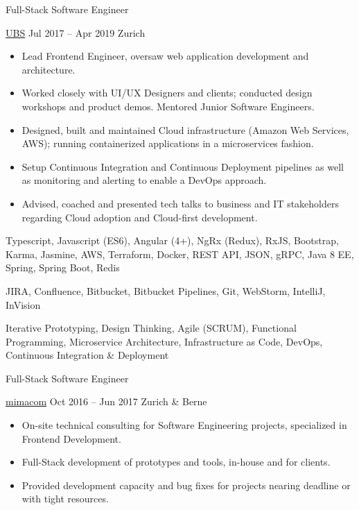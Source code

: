 \documentclass[11pt, a4paper, ragged2e, withhyper]{altacv}
\renewcommand{\cvevent}[4]{%
  {\Large\color{emphasis}#1\par}
  \medskip\normalsize
  \ifstrequal{#2}{}{}{
  	{#2}}
  \ifstrequal{#3}{}{}{{
  	\hspace{0.5em}
  	{#3}}}
  \ifstrequal{#4}{}{}{{
  	\hspace{0.5em}
  	{#4}}}\par
  \medskip\normalsize
}
\begin{document}
\begin{paracol}{2}
	\bigskip\bigskip

	\cvevent{Full-Stack Software Engineer}{\href{https://www.ubs.com/ch/en.html}{UBS}}{Jul 2017 -- Apr 2019}{Zurich}

	\bigskip
	\begin{itemize}[label=\color{bullet}\textbullet]
		\item Lead Frontend Engineer, oversaw web application development and architecture.
		\item Worked closely with UI/UX Designers and clients; conducted design workshops and product demos. Mentored Junior Software Engineers.
		\item Designed, built and maintained Cloud infrastructure (Amazon Web Services, AWS); running containerized applications in a microservices fashion.
		\item Setup Continuous Integration and Continuous Deployment pipelines as well as monitoring and alerting to enable a DevOps approach.
		\item Advised, coached and presented tech talks to business and IT stakeholders regarding Cloud adoption and Cloud-first development.
	\end{itemize}

	\bigskip
	\begin{description}
	\small
		\item [Technologies:] Typescript, Javascript (ES6), Angular (4+), NgRx (Redux), RxJS, Bootstrap, Karma, Jasmine, AWS, Terraform, Docker, REST API, JSON, gRPC, Java 8 EE, Spring, Spring Boot, Redis\smallskip
		\item [Tools:] JIRA, Confluence, Bitbucket, Bitbucket Pipelines, Git, WebStorm, IntelliJ, InVision\smallskip
		\item [Methodologies:] Iterative Prototyping, Design Thinking, Agile (SCRUM), Functional Programming, Microservice Architecture, Infrastructure as Code, DevOps, Continuous Integration \& Deployment
	\end{description}

	\bigskip\bigskip

	\cvevent{Full-Stack Software Engineer}{\href{https://www.mimacom.com/}{mimacom}}{Oct 2016 -- Jun 2017}{Zurich \& Berne}

	\bigskip
	\begin{itemize}[label=\color{bullet}\textbullet]
		\item On-site technical consulting for Software Engineering projects, specialized in Frontend Development.
		\item Full-Stack development of prototypes and tools, in-house and for clients.
		\item Provided development capacity and bug fixes for projects nearing deadline or with tight resources.
	\end{itemize}


\end{paracol}
\end{document}
